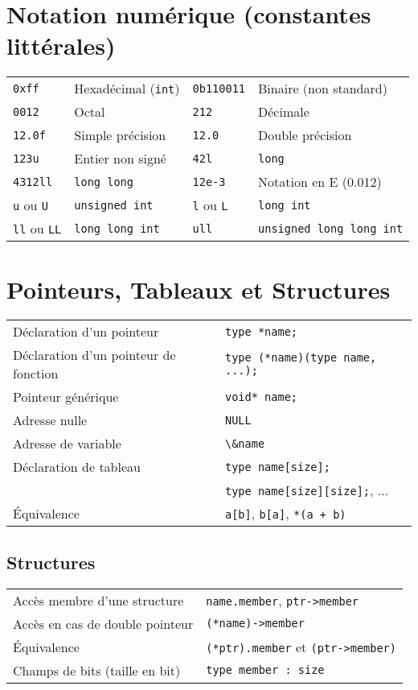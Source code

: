 \documentclass{article}
\newcommand{\cd}{\lstinline}
\begin{document}
\begin{multicols*}{3}
\section*{Notation numérique (constantes littérales)}

\begin{tabularx}{\linewidth}{
  >{\hsize=0.5\hsize}X%
  >{\hsize=1.5\hsize}X%
  >{\hsize=0.5\hsize}X%
  >{\hsize=1.5\hsize}X%
  }

  \cd{0xff}    & Hexadécimal (\texttt{int}) & \cd{0b110011}    & Binaire (non standard) \\
  \cd{0012}    & Octal & \cd{212}    & Décimale \\
  \cd{12.0f}   & Simple précision & \cd{12.0}    & Double précision \\
  \cd{123u}    & Entier non signé       & \cd{42l}     & \cd{long} \\
  \cd{4312ll}  & \cd{long long} & \cd{12e-3} & Notation en E (0.012) \\ \hline
  \cd{u} ou \cd{U}  & \cd{unsigned int} & \cd{l} ou \cd{L} & \cd{long int} \\
  \cd{ll} ou \cd{LL}  & \cd{long long int} & \cd{ull} & \cd{unsigned long long int} \\
\end{tabularx}

\section*{Pointeurs, Tableaux et Structures}
\begin{tabularx}{\linewidth}{Xl}
  Déclaration d'un pointeur & \cd{type *name;} \\
  Déclaration d'un pointeur de fonction & \cd{type (*name)(type name, ...);} \\
  Pointeur générique & \cd{void* name;} \\
  Adresse nulle & \cd{NULL} \\
  Adresse de variable & \cd{\&name} \\
  Déclaration de tableau & \cd{type name[size];} \\
                         & \cd{type name[size][size];}, ... \\
  Équivalence & \cd{a[b]}, \cd{b[a]}, \cd{*(a + b)}
\end{tabularx}

\subsection*{Structures}
\begin{tabularx}{\linewidth}{Xl}
  Accès membre d'une structure & \cd{name.member}, \cd{ptr->member} \\
  Accès en cas de double pointeur & \cd{(*name)->member} \\
  Équivalence & \cd{(*ptr).member} et \cd{(ptr->member)}  \\
  Champs de bits (taille en bit) & \cd{type member : size} \\
\end{tabularx}


\end{multicols*}
\end{document}
